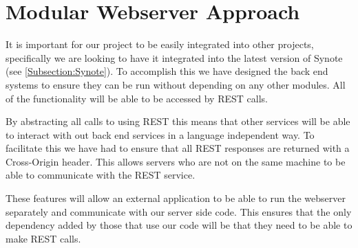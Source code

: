 \section{Modular Webserver Approach}
\label{Section:Modular Approach}
It is important for our project to be easily integrated into other projects, specifically we are looking to have it integrated into the latest version of Synote (see \autoref{Subsection:Synote}). To accomplish this we have designed the back end systems to ensure they can be run without depending on any other modules. All of the functionality will be able to be accessed by \gls{REST} calls.

By abstracting all calls to using \gls{REST} this means that other services will be able to interact with out back end services in a language independent way. To facilitate this we have had to ensure that all \gls{REST} responses are returned with a Cross-Origin header. This allows servers who are not on the same machine to be able to communicate with the \gls{REST} service.

These features will allow an external application to be able to run the webserver separately and communicate with our server side code. This ensures that the only dependency added by those that use our code will be that they need to be able to make \gls{REST} calls.


